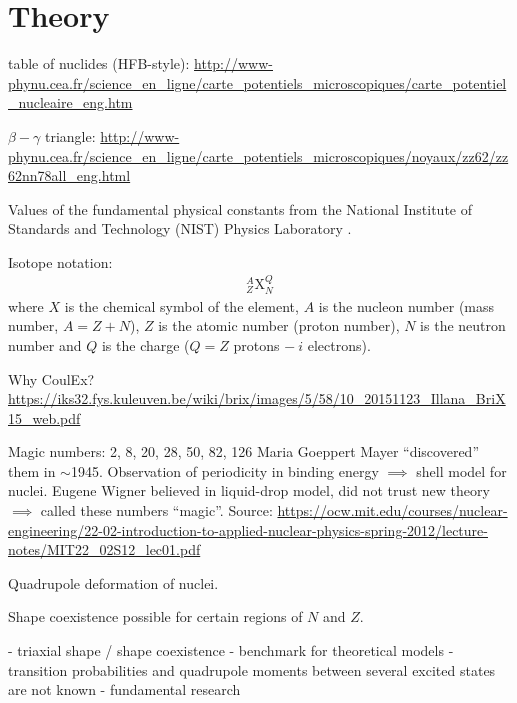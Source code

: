 \documentclass[twoside,english]{uiofysmaster/uiofysmaster}
\begin{document}
\chapter{Theory}
table of nuclides (HFB-style): \url{http://www-phynu.cea.fr/science_en_ligne/carte_potentiels_microscopiques/carte_potentiel_nucleaire_eng.htm}

$\beta-\gamma$ triangle: \url{http://www-phynu.cea.fr/science_en_ligne/carte_potentiels_microscopiques/noyaux/zz62/zz62nn78all_eng.html}

\begin{table}[ht] 
    \centering 
    \caption{Values of the fundamental physical constants from the National Institute of Standards and Technology (NIST) Physics Laboratory \cite{units}.}
	
	\label{tab:units}
\end{table}

\bigskip

Isotope notation:
\begin{align*}
	^A_Z\text{X}_N^Q
\end{align*}
where $X$ is the chemical symbol of the element, $A$ is the nucleon number (mass number, $A = Z + N$), $Z$ is the atomic number (proton number), $N$ is the neutron number and $Q$ is the charge ($Q = Z$ protons $- ~i$ electrons). 

\bigskip

Why CoulEx? \url{https://iks32.fys.kuleuven.be/wiki/brix/images/5/58/10_20151123_Illana_BriX15_web.pdf} \newline


Magic numbers: 2, 8, 20, 28, 50, 82, 126 \newline
Maria Goeppert Mayer “discovered” them in $\sim$1945. Observation of periodicity in binding energy $\implies$ shell model for nuclei. \newline
Eugene Wigner believed in liquid-drop model, did not trust new theory $\implies$ called these numbers “magic”. \newline
Source: \url{https://ocw.mit.edu/courses/nuclear-engineering/22-02-introduction-to-applied-nuclear-physics-spring-2012/lecture-notes/MIT22_02S12_lec01.pdf}

\bigskip

Quadrupole deformation of nuclei. \newline

Shape coexistence possible for certain regions of $N$ and $Z$.

\bigskip

- triaxial shape / shape coexistence \newline
- benchmark for theoretical models \newline
- transition probabilities and quadrupole moments between several excited states are not known \newline
- fundamental research
\end{document}

